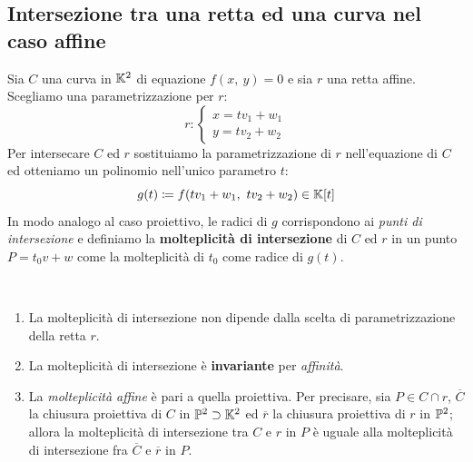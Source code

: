 \subsection{Intersezione tra una retta ed una curva nel caso affine}
Sia $C$ una curva in $\mathbb{K}^2$ di equazione $f\left(x,\ y\right)=0$ e sia $r$ una retta affine. Scegliamo una parametrizzazione per $r$:
\begin{equation}
	r\colon\begin{cases}
	x=tv_1+w_1\\
	y=tv_2+w_2
\end{cases}
\end{equation}
Per intersecare $C$ ed $r$ sostituiamo la parametrizzazione di $r$ nell'equazione di $C$ ed otteniamo un polinomio nell'unico parametro $t$:
\begin{equation}
	g(t)\coloneqq f(tv_1+w_1,\ tv_2+w_2)\in\kamp[t]
\end{equation}
In modo analogo al caso proiettivo, le radici di $g$ corrispondono ai \textit{punti di intersezione} e definiamo la \textbf{molteplicità di intersezione} di $C$ ed $r$ in un punto $P=t_0v+w$ come la molteplicità di $t_0$ come radice di $g(t)$.\\
\begin{observes}~{}
		\begin{enumerate}
		\item	La molteplicità di intersezione non dipende dalla scelta di parametrizzazione della retta $r$.
		\item	La molteplicità di intersezione è \textbf{invariante} per \textit{affinità}.
		\item	La \textit{molteplicità affine} è pari a quella proiettiva. Per precisare, sia $P\in C\cap r$, $\overline{C}$ la chiusura proiettiva di $C$ in $\proj[2]{\ }\supset\kamp^2$ ed $\overline{r}$ la chiusura proiettiva di $r$ in $\proj[2]{\ }$; allora la molteplicità di intersezione tra $C$ e $r$ in $P$ è uguale alla molteplicità di intersezione fra $\overline{C}$ e $\overline{r}$ in $P$.
	\end{enumerate}
\vspace{-3mm}
\end{observes}

